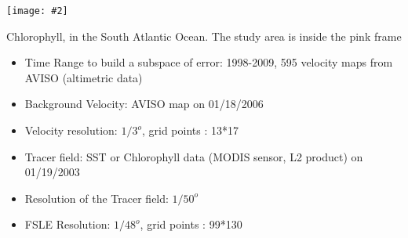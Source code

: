 \documentclass[portrait,a0,final]{a0poster}
\newenvironment{poster}{
  \begin{center}
  \begin{minipage}[c]{1.0\textwidth}
}{
  \end{minipage} 
  \end{center}
}
\newenvironment{pcolumn}[1]{
  \begin{minipage}{#1\textwidth}
}{
  \end{minipage}
}
\newcommand{\myfig}[3][0]{
\begin{center}
  \vspace{0.10cm}
  \texttt{[image: \#2]}
\end{center}}
\begin{document}
\begin{poster}
\begin{multicols}{2}
\begin{center}
{    \vspace*{0.2cm}
    {\large  
    \vspace*{0.2cm}
\begin{minipage}{0.35\textwidth}
 
      \myfig{./pict/s_atl/s_atlb.eps}{0.99}
      \small{Chlorophyll, in the South Atlantic Ocean. The study area is inside the pink frame}
\end{minipage}
\begin{minipage}{0.65\textwidth}
  \begin{itemize}
    \item Time Range to build a subspace of error: 1998-2009, 595 velocity maps from AVISO (altimetric data)
    \item Background Velocity: AVISO map on 01/18/2006
    \item Velocity resolution: $1/3^o$, grid points : 13*17
    \item Tracer field: SST or Chlorophyll data (MODIS sensor, L2 product) on 01/19/2003
    \item Resolution of the Tracer field: $1/50^o$
    \item FSLE Resolution: $1/48^o$, grid points : 99*130
  \end{itemize}
\end{minipage}
%
  } %
  } %
  \end{center}
 

\end{multicols}
\end{poster}
\end{document}
